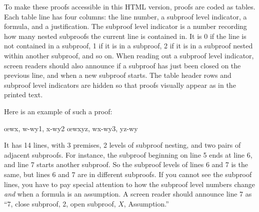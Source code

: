 \documentclass{book}
\begin{document}
To make these proofs accessible in this HTML version, proofs are coded
as tables. Each table line has four columns: the line number, a
subproof level indicator, a formula, and a justification. The subproof
level indicator is a number recording how many nested subproofs the
current line is contained in. It is 0 if the line is not contained in
a subproof, 1 if it is in a subproof, 2 if it is in a subproof nested
within another subproof, and so on. When reading out a subproof level
indicator, screen readers should also announce if a subproof has just
been closed on the previous line, and when a new subproof starts. The
table header rows and subproof level indicators are hidden so that
proofs visually appear as in the printed text.

Here is an example of such a proof:
\begin{fitchproof}
\PR
{}\PR
{}\PR
\open
	\AS
	\open
		\AS
	\close
	\open
		\AS
	\close
	\oe{wx, w-wy1, x-wy2}
\close
\open
	\AS
\close
{}\oe{wxyz, wx-wy3, yz-wy}
\end{fitchproof}
It has 14 lines, with 3 premises, 2 levels of subproof nesting, and
two pairs of adjacent subproofs. For instance, the subproof beginning
on line 5 ends at line 6, and line 7 starts another subproof. So the
subproof levels of lines 6 and 7 is the same, but lines 6 and 7 are in
different subproofs. If you cannot see the subproof lines, you have to
pay special attention to how the subproof level numbers change
\emph{and} when a formula is an assumption. A screen reader should
announce line 7 as ``7, close subproof, 2, open subproof, $X$,
Assumption.''
\end{document}
